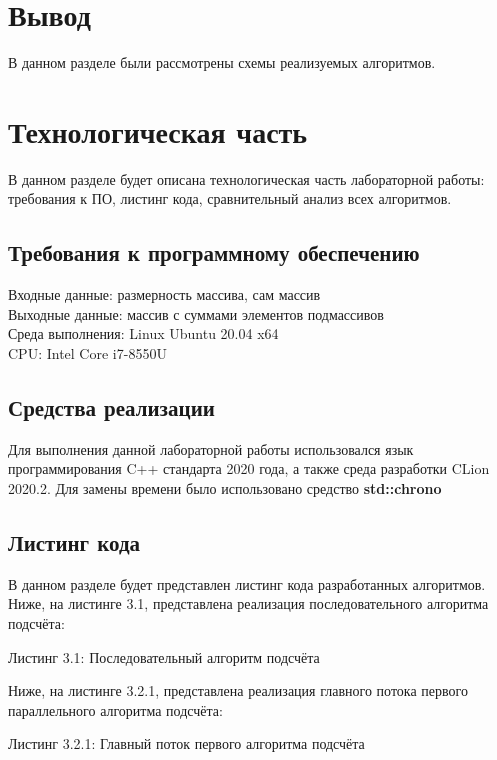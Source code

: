 \documentclass[12pt,a4paper]{article}
\numberwithin{equation}{section}
\begin{document}
\section*{Вывод}
\qquad В данном разделе были рассмотрены схемы реализуемых алгоритмов.
\clearpage

\section{Технологическая часть}
\qquad В данном разделе будет описана технологическая часть лабораторной работы: требования к ПО, листинг кода, сравнительный анализ всех алгоритмов.
\subsection{Требования к программному обеспечению}
\qquad Входные данные: размерность массива, сам массив\\
\qquad Выходные данные: массив с суммами элементов подмассивов\\
\qquad Среда выполнения: Linux Ubuntu 20.04 x64\\
\qquad CPU: Intel Core i7-8550U
\subsection{Средства реализации}
\qquad Для выполнения данной лабораторной работы использовался язык программирования C++ стандарта 2020 года, а также среда разработки CLion 2020.2. Для замены времени было использовано средство \textbf{std::chrono} \cite{litlink4}
\subsection{Листинг кода}
\qquad В данном разделе будет представлен листинг кода разработанных алгоритмов.\\

Ниже, на листинге 3.1, представлена реализация последовательного алгоритма подсчёта:
\begin{center}
	Листинг 3.1: Последовательный алгоритм подсчёта
	
\end{center}
\clearpage

Ниже, на листинге 3.2.1, представлена реализация главного потока первого параллельного алгоритма подсчёта:
\begin{center}
	Листинг 3.2.1: Главный поток первого алгоритма подсчёта
	
\end{center}
\end{document}
